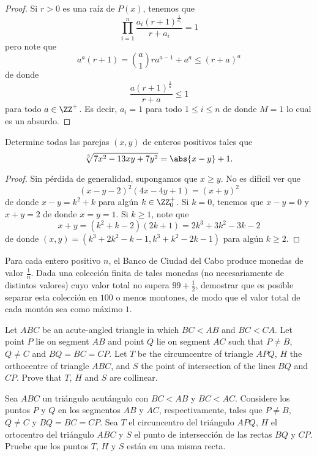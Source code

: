 \begin{proof}
	Si $r>0$ es una raíz de $P(x)$, tenemos que
	\[\prod_{i=1}^n\frac{a_i(r+1)^\frac{1}{a_i}}{r+a_i}=1\]
	pero note que
	\[a^a(r+1)=\binom{a}{1}ra^{a-1}+a^a\le(r+a)^a\]
	de donde
	\[\frac{a(r+1)^\frac{1}{a}}{r+a}\le 1\]
	para todo $a\in\ZZ^+$. Es decir, $a_i=1$ para todo $1\le i\le n$ de donde $M=1$ lo cual es un absurdo.
\end{proof}

\begin{probEG}
	Determine todas las parejas $(x,y)$ de enteros positivos tales que
	\[\sqrt[3]{7x^2-13xy+7y^2}=\abs{x-y}+1.\]
\end{probEG}

\begin{proof}
	Sin pérdida de generalidad, supongamos que $x\ge y$. No es difícil ver que
	\[(x-y-2)^2(4x-4y+1)=(x+y)^2\]
	de donde $x-y=k^2+k$ para algún $k\in\ZZ^+_0$. Si $k=0$, tenemos que $x-y=0$ y $x+y=2$ de donde $x=y=1$. Si $k\ge 1$, note que
	\[x+y=(k^2+k-2)(2k+1)=2k^3+3k^2-3k-2\]
	de donde $(x,y)=(k^3+2k^2-k-1,k^3+k^2-2k-1)$ para algún $k\ge 2$.
\end{proof}

\begin{problem}
	Para cada entero positivo $n$, el Banco de Ciudad del Cabo produce monedas de valor $\frac1n$. Dada una colección finita de tales monedas (no necesariamente de distintos valores) cuyo valor total no supera $99+\frac12$, demostrar que es posible separar esta colección en $100$ o menos montones, de modo que el valor total de cada montón sea como máximo $1$.
\end{problem}

\begin{probEG}[EGMO 2022/1]
	Let $ABC$ be an acute-angled triangle in which $BC<AB$ and $BC<CA$. Let point $P$ lie on segment $AB$ and point $Q$ lie on segment $AC$ such that $P\ne B$, $Q\ne C$ and $BQ=BC=CP$. Let $T$ be the circumcentre of triangle $APQ$, $H$ the orthocentre of triangle $ABC$, and $S$ the point of intersection of the lines $BQ$ and $CP$. Prove that $T$, $H$ and $S$ are collinear.
	\begin{probSP}
		Sea $ABC$ un triángulo acutángulo con $BC<AB$ y $BC<AC$. Considere los puntos $P$ y $Q$ en los segmentos $AB$ y $AC$, respectivamente, tales que $P\ne B$, $Q\ne C$ y $BQ=BC=CP$. Sea $T$ el circuncentro del triángulo $APQ$, $H$ el ortocentro del triángulo $ABC$ y $S$ el punto de intersección de las rectas $BQ$ y $CP$. Pruebe que los puntos $T$, $H$ y $S$ están en una misma recta.
	\end{probSP}
\end{probEG}

